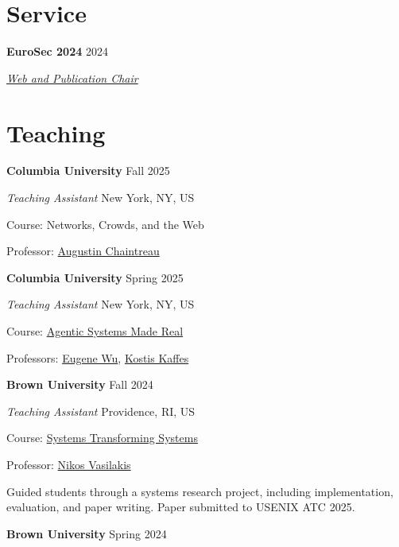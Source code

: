 \documentclass[margin,11pt]{resume}
\newcommand{\descriptionVSpace}{\vspace{0.5ex}\xspace}
\newcommand{\subsectionVSpace}{\vspace{3.5ex}\xspace}
\newcommand{\sectionVSpace}{\vspace{1ex}\xspace} %
\newcommand{\sectionVSpaceCorrection}{\vspace{-3.5ex}} %
\newcommand{\header}[1]{\textbf{#1}\xspace}
\newcommand{\institution}[1]{\header{#1}\xspace}
\newcommand{\place}[1]{#1\xspace}
\newcommand{\role}[1]{\textit{#1}\xspace}
\newcommand{\service}[1]{\header{#1}\xspace}
\newcommand{\singleDate}[1]{#1\xspace}
\newcommand{\stitle}[1]{#1:\xspace}
\newenvironment{rSubsection}{}{\par\subsectionVSpace}
\newenvironment{rSection}[1]{\sectionVSpaceCorrection\section{#1}\xspace}{\sectionVSpace\par}
\newenvironment{jobDuties}{\descriptionVSpace}{\par}
\begin{document}
\begin{resume}
\begin{rSection}{Service}
		\begin{rSubsection}
			\service{EuroSec 2024} \hfill 2024

			\role{\href{https://secopera.eu/eurosec-2024/}{Web and Publication Chair}}
		\end{rSubsection}
	\end{rSection}

	\begin{rSection}{Teaching}
		\begin{rSubsection}
			\institution{Columbia University} \hfill \singleDate{Fall 2025}

			\role{Teaching Assistant} \hfill \place{New York, NY, US}

			\stitle{Course} Networks, Crowds, and the Web

			\stitle{Professor} \href{https://www.engineering.columbia.edu/faculty-staff/directory/augustin-chaintreau}{Augustin Chaintreau}
		\end{rSubsection}

		\begin{rSubsection}
			\institution{Columbia University} \hfill \singleDate{Spring 2025}

			\role{Teaching Assistant} \hfill \place{New York, NY, US}

			\stitle{Course} \href{https://w6113.github.io/}{Agentic Systems Made Real}

			\stitle{Professors} \href{https://www.cs.columbia.edu/~ewu/}{Eugene Wu}, \href{https://www.cs.columbia.edu/~kkaffes/index.html}{Kostis Kaffes}
		\end{rSubsection}

		\begin{rSubsection}
			\institution{Brown University} \hfill \singleDate{Fall 2024}

			\role{Teaching Assistant} \hfill \place{Providence, RI, US}

			\stitle{Course} \href{https://cs.brown.edu/courses/csci2952r/}{Systems Transforming Systems}

			\stitle{Professor} \href{https://nikos.vasilak.is}{Nikos Vasilakis}

			\begin{jobDuties}
				Guided students through a systems research project, including implementation, evaluation, and paper writing.
				Paper submitted to USENIX ATC 2025.
			\end{jobDuties}
		\end{rSubsection}

		\begin{rSubsection}
			\institution{Brown University} \hfill \singleDate{Spring 2024}


\end{rSubsection}
\end{rSection}
\end{resume}
\end{document}
